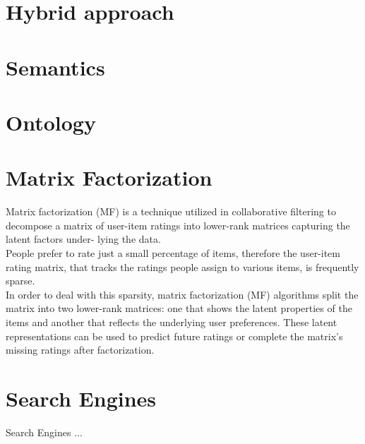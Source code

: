 \documentclass[10pt,oneside,english,a4paper]{article}
\begin{document}
\section{Hybrid approach}

\clearpage
\section{Semantics}

\section{Ontology}

\section{Matrix Factorization}
Matrix factorization (MF) is a technique utilized in collaborative filtering to decompose
a matrix of user-item ratings into lower-rank matrices capturing the latent factors under-
lying the data\cite{Tokala2023}.\\
People prefer to rate just a small percentage of items, therefore the user-item rating matrix, that tracks the ratings people assign to various items, is frequently sparse.\\
In order to deal with this sparsity, matrix factorization (MF) algorithms split the matrix into two lower-rank matrices: one that shows the latent properties of the items and another that reflects the underlying user preferences. These latent representations can be used to predict future ratings or complete the matrix's missing ratings after factorization.

\section{Search Engines}
Search Engines ... \cite{pub.1171882357}


\clearpage
\thispagestyle{empty}
\mbox{}
\clearpage








\clearpage 
\normalsize 
 
 
\nocite{*}
\end{document}
